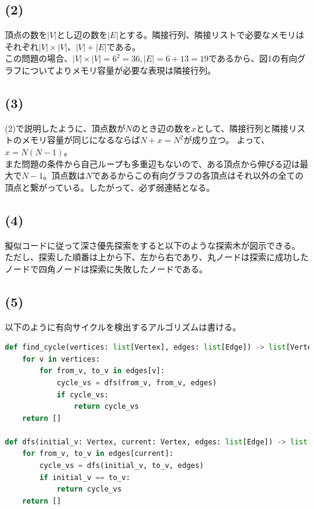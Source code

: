 \documentclass[a4paper,12pt,xelatex,ja=standard]{bxjsarticle}
\begin{document}
\subsection*{(2)}
頂点の数を$|V|$とし辺の数を$|E|$とする。隣接行列、隣接リストで必要なメモリはそれぞれ$|V| \times |V|$、$|V| + |E|$である。\\
この問題の場合、$|V| \times |V| = 6^2 = 36, |E| = 6 + 13 = 19$であるから、図1の有向グラフについてよりメモリ容量が必要な表現は隣接行列。

\subsection*{(3)}
(2)で説明したように、頂点数が$N$のとき辺の数を$x$として、隣接行列と隣接リストのメモリ容量が同じになるならば$N + x = N^2$が成り立つ。
よって、$x = N(N - 1)$。\\
また問題の条件から自己ループも多重辺もないので、ある頂点から伸びる辺は最大で$N-1$。頂点数は$N$であるからこの有向グラフの各頂点はそれ以外の全ての頂点と繋がっている。したがって、必ず弱連結となる。

\subsection*{(4)}
擬似コードに従って深さ優先探索をすると以下のような探索木が図示できる。\\
ただし、探索した順番は上から下、左から右であり、丸ノードは探索に成功したノードで四角ノードは探索に失敗したノードである。
\begin{center}
\end{center}

\subsection*{(5)}
以下のように有向サイクルを検出するアルゴリズムは書ける。
\begin{lstlisting}[language=Python, caption="有向サイクル検出アルゴリズム"]
def find_cycle(vertices: list[Vertex], edges: list[Edge]) -> list[Vertex]:
    for v in vertices:
        for from_v, to_v in edges[v]:
            cycle_vs = dfs(from_v, from_v, edges)
            if cycle_vs:
                return cycle_vs
    return []

def dfs(initial_v: Vertex, current: Vertex, edges: list[Edge]) -> list[Vertex]:
    for from_v, to_v in edges[current]:
        cycle_vs = dfs(initial_v, to_v, edges)
        if initial_v == to_v:
            return cycle_vs
    return []
\end{lstlisting}
\end{document}

